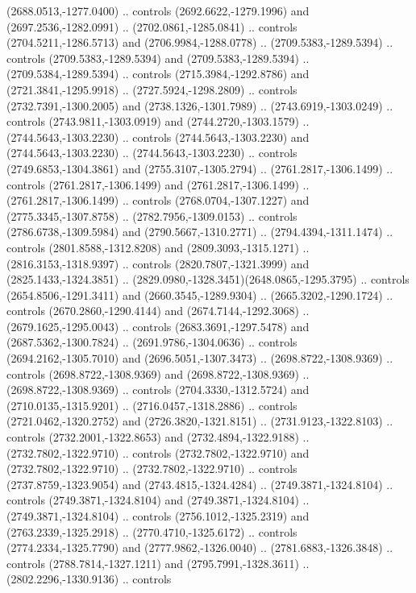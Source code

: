 \begin{scope}[shift={(28.3138,-376.6591)}]
\begin{scope}[shift={(-2186.6262,1813.8454)}]
      (2688.0513,-1277.0400) .. controls (2692.6622,-1279.1996) and
      (2697.2536,-1282.0991) .. (2702.0861,-1285.0841) .. controls
      (2704.5211,-1286.5713) and (2706.9984,-1288.0778) .. (2709.5383,-1289.5394) ..
      controls (2709.5383,-1289.5394) and (2709.5383,-1289.5394) ..
      (2709.5384,-1289.5394) .. controls (2715.3984,-1292.8786) and
      (2721.3841,-1295.9918) .. (2727.5924,-1298.2809) .. controls
      (2732.7391,-1300.2005) and (2738.1326,-1301.7989) .. (2743.6919,-1303.0249) ..
      controls (2743.9811,-1303.0919) and (2744.2720,-1303.1579) ..
      (2744.5643,-1303.2230) .. controls (2744.5643,-1303.2230) and
      (2744.5643,-1303.2230) .. (2744.5643,-1303.2230) .. controls
      (2749.6853,-1304.3861) and (2755.3107,-1305.2794) .. (2761.2817,-1306.1499) ..
      controls (2761.2817,-1306.1499) and (2761.2817,-1306.1499) ..
      (2761.2817,-1306.1499) .. controls (2768.0704,-1307.1227) and
      (2775.3345,-1307.8758) .. (2782.7956,-1309.0153) .. controls
      (2786.6738,-1309.5984) and (2790.5667,-1310.2771) .. (2794.4394,-1311.1474) ..
      controls (2801.8588,-1312.8208) and (2809.3093,-1315.1271) ..
      (2816.3153,-1318.9397) .. controls (2820.7807,-1321.3999) and
      (2825.1433,-1324.3851) .. (2829.0980,-1328.3451)(2648.0865,-1295.3795) ..
      controls (2654.8506,-1291.3411) and (2660.3545,-1289.9304) ..
      (2665.3202,-1290.1724) .. controls (2670.2860,-1290.4144) and
      (2674.7144,-1292.3068) .. (2679.1625,-1295.0043) .. controls
      (2683.3691,-1297.5478) and (2687.5362,-1300.7824) .. (2691.9786,-1304.0636) ..
      controls (2694.2162,-1305.7010) and (2696.5051,-1307.3473) ..
      (2698.8722,-1308.9369) .. controls (2698.8722,-1308.9369) and
      (2698.8722,-1308.9369) .. (2698.8722,-1308.9369) .. controls
      (2704.3330,-1312.5724) and (2710.0135,-1315.9201) .. (2716.0457,-1318.2886) ..
      controls (2721.0462,-1320.2752) and (2726.3820,-1321.8151) ..
      (2731.9123,-1322.8103) .. controls (2732.2001,-1322.8653) and
      (2732.4894,-1322.9188) .. (2732.7802,-1322.9710) .. controls
      (2732.7802,-1322.9710) and (2732.7802,-1322.9710) .. (2732.7802,-1322.9710) ..
      controls (2737.8759,-1323.9054) and (2743.4815,-1324.4284) ..
      (2749.3871,-1324.8104) .. controls (2749.3871,-1324.8104) and
      (2749.3871,-1324.8104) .. (2749.3871,-1324.8104) .. controls
      (2756.1012,-1325.2319) and (2763.2339,-1325.2918) .. (2770.4710,-1325.6172) ..
      controls (2774.2334,-1325.7790) and (2777.9862,-1326.0040) ..
      (2781.6883,-1326.3848) .. controls (2788.7814,-1327.1211) and
      (2795.7991,-1328.3611) .. (2802.2296,-1330.9136) .. controls

\end{scope}
\end{scope}
